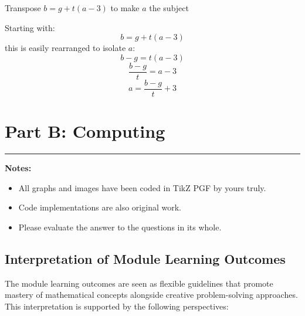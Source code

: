 \documentclass[a4paper, 12pt]{report}
\begin{document}
    \newpage
    \begin{tcolorbox}[title=\color{black}{\section{Q10}}, colback=white, colframe=black!30!white, boxrule=0.4mm, width=1\textwidth]
        Transpose \( b=g+t(a-3) \) to make \( a \) the subject
    \end{tcolorbox}
    
    Starting with:
    \[b = g + t(a - 3)\]
    this is easily rearranged to isolate \( a \):
    \[b - g = t(a - 3)\]
    \[\frac{b - g}{t} = a - 3\]
    \[\boxed{a = \frac{b - g}{t} + 3}\]
    
    \newpage\raggedright
    \thispagestyle{empty}
    
    \chapter{Part B: Computing}

    \hrule
    \vspace{3em}
    \begin{center}
        \Large\textbf{Notes:}
    \end{center}
    \vspace{1em}
    \begin{itemize}
        \item All graphs and images have been coded in TikZ PGF by yours truly.
        \item Code implementations are also original work.
        \item Please evaluate the answer to the questions in its whole. 
    \end{itemize}
    
    \vspace{1em}
    
    \section*{Interpretation of Module Learning Outcomes}
    
    The module learning outcomes are seen as flexible guidelines that promote mastery of mathematical concepts alongside creative problem-solving approaches. This interpretation is supported by the following perspectives:
    
\end{document}
